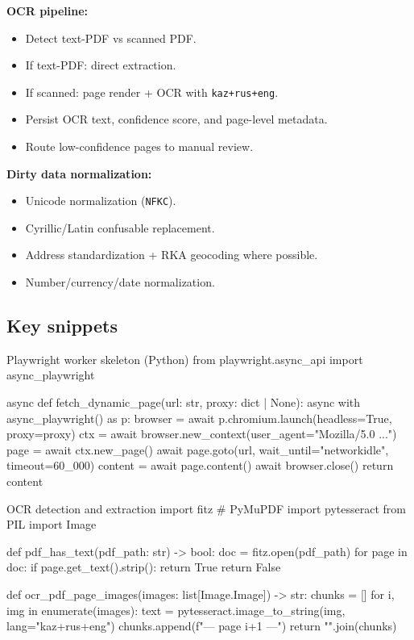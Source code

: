 \documentclass[11pt,a4paper]{article}
\begin{document}
\textbf{OCR pipeline:}
\begin{itemize}[leftmargin=1.4em]
  \item Detect text-PDF vs scanned PDF.
  \item If text-PDF: direct extraction.
  \item If scanned: page render + OCR with \texttt{kaz+rus+eng}.
  \item Persist OCR text, confidence score, and page-level metadata.
  \item Route low-confidence pages to manual review.
\end{itemize}

\textbf{Dirty data normalization:}
\begin{itemize}[leftmargin=1.4em]
  \item Unicode normalization (\texttt{NFKC}).
  \item Cyrillic/Latin confusable replacement.
  \item Address standardization + RKA geocoding where possible.
  \item Number/currency/date normalization.
\end{itemize}

\subsection{Key snippets}
\begin{codeblock}[language=Python]{Playwright worker skeleton (Python)}
from playwright.async_api import async_playwright

async def fetch_dynamic_page(url: str, proxy: dict | None):
    async with async_playwright() as p:
        browser = await p.chromium.launch(headless=True, proxy=proxy)
        ctx = await browser.new_context(user_agent="Mozilla/5.0 ...")
        page = await ctx.new_page()
        await page.goto(url, wait_until="networkidle", timeout=60_000)
        content = await page.content()
        await browser.close()
        return content
\end{codeblock}

\begin{codeblock}[language=Python]{OCR detection and extraction}
import fitz  # PyMuPDF
import pytesseract
from PIL import Image

def pdf_has_text(pdf_path: str) -> bool:
    doc = fitz.open(pdf_path)
    for page in doc:
        if page.get_text().strip():
            return True
    return False

def ocr_pdf_page_images(images: list[Image.Image]) -> str:
    chunks = []
    for i, img in enumerate(images):
        text = pytesseract.image_to_string(img, lang="kaz+rus+eng")
        chunks.append(f"\n--- page {i+1} ---")
    return "".join(chunks)
\end{codeblock}
\end{document}
